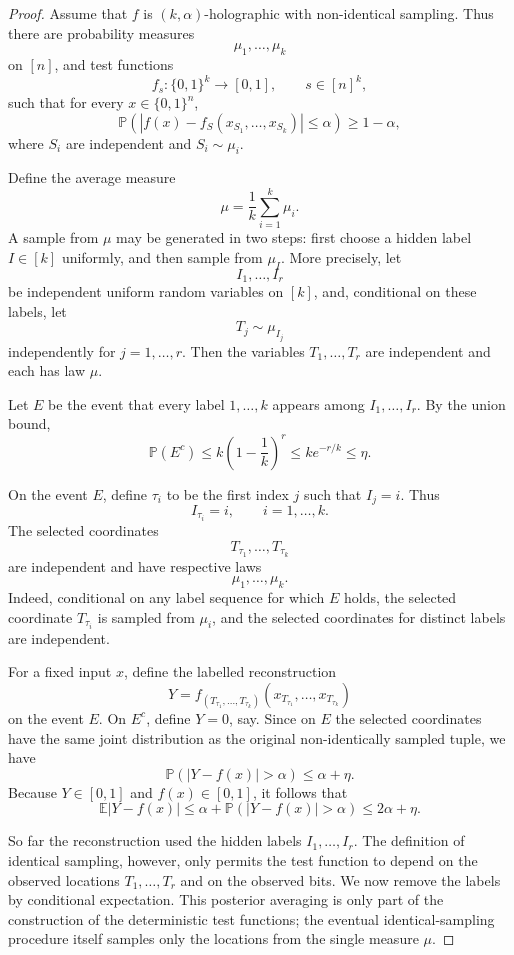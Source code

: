 \documentclass[11pt]{amsart}
\newcommand{\1}{\mathbf 1}
\begin{document}
\begin{proof}
Assume that \(f\) is \((k,\alpha)\)-holographic with non-identical sampling.
Thus there are probability measures
\[
        \mu_1,\ldots,\mu_k
\]
on \([n]\), and test functions
\[
        f_s:\{0,1\}^k\to[0,1],
        \qquad s\in[n]^k,
\]
such that for every \(x\in\{0,1\}^n\),
\[
        \mathbb P\left(
        \left|f(x)-f_S(x_{S_1},\ldots,x_{S_k})\right|
        \leq \alpha
        \right)
        \geq 1-\alpha ,
\]
where \(S_i\) are independent and \(S_i\sim\mu_i\).

Define the average measure
\[
        \mu=\frac1k\sum_{i=1}^k \mu_i .
\]
A sample from \(\mu\) may be generated in two steps: first choose a hidden label
\(I\in[k]\) uniformly, and then sample from \(\mu_I\).  More precisely, let
\[
        I_1,\ldots,I_r
\]
be independent uniform random variables on \([k]\), and, conditional on these
labels, let
\[
        T_j\sim \mu_{I_j}
\]
independently for \(j=1,\ldots,r\).  Then the variables \(T_1,\ldots,T_r\) are
independent and each has law \(\mu\).

Let \(E\) be the event that every label \(1,\ldots,k\) appears among
\(I_1,\ldots,I_r\).  By the union bound,
\[
        \mathbb P(E^c)
        \leq
        k\left(1-\frac1k\right)^r
        \leq
        k e^{-r/k}
        \leq \eta .
\]

On the event \(E\), define \(\tau_i\) to be the first index \(j\) such that
\(I_j=i\).  Thus
\[
        I_{\tau_i}=i,
        \qquad i=1,\ldots,k.
\]
The selected coordinates
\[
        T_{\tau_1},\ldots,T_{\tau_k}
\]
are independent and have respective laws
\[
        \mu_1,\ldots,\mu_k.
\]
Indeed, conditional on any label sequence for which \(E\) holds, the selected
coordinate \(T_{\tau_i}\) is sampled from \(\mu_i\), and the selected
coordinates for distinct labels are independent.

For a fixed input \(x\), define the labelled reconstruction
\[
        Y
        =
        f_{(T_{\tau_1},\ldots,T_{\tau_k})}
        (x_{T_{\tau_1}},\ldots,x_{T_{\tau_k}})
\]
on the event \(E\).  On \(E^c\), define \(Y=0\), say.  Since on \(E\) the
selected coordinates have the same joint distribution as the original
non-identically sampled tuple, we have
\[
        \mathbb P\left(|Y-f(x)|>\alpha\right)
        \leq
        \alpha+\eta .
\]
Because \(Y\in[0,1]\) and \(f(x)\in[0,1]\), it follows that
\[
        \mathbb E |Y-f(x)|
        \leq
        \alpha+\mathbb P(|Y-f(x)|>\alpha)
        \leq
        2\alpha+\eta .
\]

So far the reconstruction used the hidden labels \(I_1,\ldots,I_r\).  The
definition of identical sampling, however, only permits the test function to
depend on the observed locations \(T_1,\ldots,T_r\) and on the observed bits.
We now remove the labels by conditional expectation.  This posterior averaging
is only part of the construction of the deterministic test functions; the
eventual identical-sampling procedure itself samples only the locations from
the single measure \(\mu\).


\end{proof}
\end{document}
